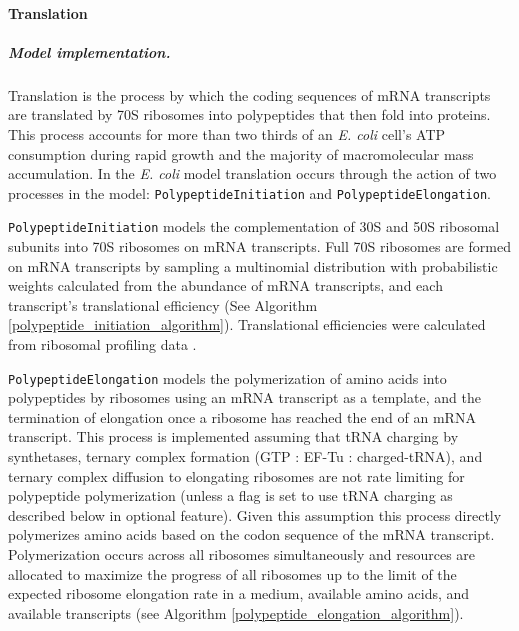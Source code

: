 \documentclass[12pt]{article}
\begin{document}
\baselineskip24pt

\paragraph{Translation}

\subparagraph{Model implementation.}
Translation is the process by which the coding sequences of mRNA transcripts are translated by 70S ribosomes into polypeptides that then fold into proteins. This process accounts for more than two thirds of an \emph{E. coli} cell's ATP consumption during rapid growth \cite{Russell:1995vc} and the majority of macromolecular mass accumulation. In the \emph{E. coli} model  translation occurs through the action of two processes in the model: \texttt{PolypeptideInitiation} and \texttt{PolypeptideElongation}.

\texttt{PolypeptideInitiation} models the complementation of 30S and 50S ribosomal subunits into 70S ribosomes on mRNA transcripts. Full 70S ribosomes are formed on mRNA transcripts by sampling a multinomial distribution with probabilistic weights calculated from the abundance of mRNA transcripts, and each transcript's translational efficiency (See Algorithm \ref{polypeptide_initiation_algorithm}). Translational efficiencies were calculated from ribosomal profiling data \cite{li2014quantifying}.

\texttt{PolypeptideElongation} models the polymerization of amino acids into polypeptides by ribosomes using an mRNA transcript as a template, and the termination of elongation once a ribosome has reached the end of an mRNA transcript. This process is implemented assuming that tRNA charging by synthetases, ternary complex formation (GTP : EF-Tu : charged-tRNA), and ternary complex diffusion to elongating ribosomes are not rate limiting for polypeptide polymerization (unless a flag is set to use tRNA charging as described below in optional feature). Given this assumption this process directly polymerizes amino acids based on the codon sequence of the mRNA transcript. Polymerization occurs across all ribosomes simultaneously and resources are allocated to maximize the progress of all ribosomes up to the limit of the expected ribosome elongation rate in a medium, available amino acids, and available transcripts (see Algorithm \ref{polypeptide_elongation_algorithm}).
\end{document}
